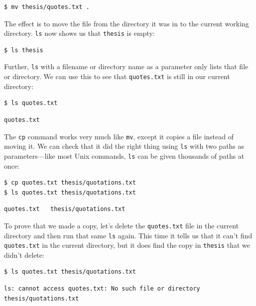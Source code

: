 \documentclass{book}
\begin{document}
\begin{verbatim}
$ mv thesis/quotes.txt .
\end{verbatim}

The effect is to move the file from the directory it was in to the
current working directory. \texttt{ls} now shows us that \texttt{thesis}
is empty:

\begin{verbatim}
$ ls thesis
\end{verbatim}

Further, \texttt{ls} with a filename or directory name as a parameter
only lists that file or directory. We can use this to see that
\texttt{quotes.txt} is still in our current directory:

\begin{verbatim}
$ ls quotes.txt
\end{verbatim}

\begin{verbatim}
quotes.txt
\end{verbatim}

The \texttt{cp} command works very much like \texttt{mv}, except it
copies a file instead of moving it. We can check that it did the right
thing using \texttt{ls} with two paths as parameters---like most Unix
commands, \texttt{ls} can be given thousands of paths at once:

\begin{verbatim}
$ cp quotes.txt thesis/quotations.txt
$ ls quotes.txt thesis/quotations.txt
\end{verbatim}

\begin{verbatim}
quotes.txt   thesis/quotations.txt
\end{verbatim}

To prove that we made a copy, let's delete the \texttt{quotes.txt} file
in the current directory and then run that same \texttt{ls} again. This
time it tells us that it can't find \texttt{quotes.txt} in the current
directory, but it does find the copy in \texttt{thesis} that we didn't
delete:

\begin{verbatim}
$ ls quotes.txt thesis/quotations.txt
\end{verbatim}

\begin{verbatim}
ls: cannot access quotes.txt: No such file or directory
thesis/quotations.txt
\end{verbatim}
\end{document}
